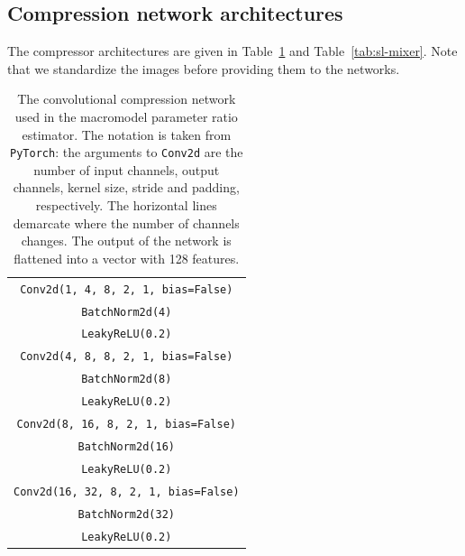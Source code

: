 \begin{subappendices}

\section{Compression network architectures}
\label{app:architectures}

The compressor architectures are given in Table~\ref{tab:sl-cnn} and Table~\ref{tab:sl-mixer}. Note that we standardize the images before providing them to the networks.

\begin{table}
    \centering
    \begin{tabular}{c}
        \toprule
        \texttt{Conv2d(1, 4, 8, 2, 1, bias=False)} \\
        \texttt{BatchNorm2d(4)} \\
        \texttt{LeakyReLU(0.2)} \\
        \midrule
        \texttt{Conv2d(4, 8, 8, 2, 1, bias=False)} \\
        \texttt{BatchNorm2d(8)} \\
        \texttt{LeakyReLU(0.2)} \\
        \midrule
        \texttt{Conv2d(8, 16, 8, 2, 1, bias=False)} \\
        \texttt{BatchNorm2d(16)} \\
        \texttt{LeakyReLU(0.2)} \\
        \midrule
        \texttt{Conv2d(16, 32, 8, 2, 1, bias=False)} \\
        \texttt{BatchNorm2d(32)} \\
        \texttt{LeakyReLU(0.2)} \\
        \bottomrule
    \end{tabular}
    \label{tab:sl-cnn}
    \caption{The convolutional compression network used in the macromodel parameter ratio estimator. The notation is taken from \texttt{PyTorch}: the arguments to \texttt{Conv2d} are the number of input channels, output channels, kernel size, stride and padding, respectively. The horizontal lines demarcate where the number of channels changes. The output of the network is flattened into a vector with \num{128} features.}
\end{table}


\end{subappendices}
